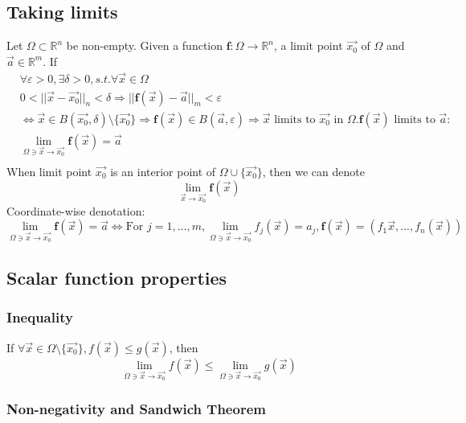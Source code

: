 \documentclass[11pt, a4paper]{article}
\begin{document}
    \subsection{Taking limits}
    Let $\Omega \subset \mathbb{R}^n$ be non-empty. Given a function $\bm{f}: \Omega \to \mathbb{R}^n$, a limit point $\vec{x_0}$ of $\Omega$ and $\vec{a} \in \mathbb{R}^m$. If
    $$\begin{aligned}
        &\forall \varepsilon > 0, \exists \delta > 0, s.t. \forall \vec{x} \in \Omega \\
        &0 < ||\vec{x} - \vec{x_0}||_n < \delta \Rightarrow ||\bm{f}(\vec{x}) - \vec{a}||_m < \varepsilon \\
        &\Leftrightarrow \vec{x} \in B(\vec{x_0}, \delta) \setminus \{\vec{x_0} \} \Rightarrow \bm{f}(\vec{x}) \in B(\vec{a}, \varepsilon)
        \Rightarrow \vec{x} \text{ limits to } \vec{x_0} \text{ in } \Omega. \bm{f}(\vec{x}) \text{ limits to } \vec{a}: \\
        &\lim\limits_{\Omega \ni \vec{x} \to \vec{x_0}} \bm{f}(\vec{x}) = \vec{a} \\
    \end{aligned}$$
    When limit point $\vec{x_0}$ is an interior point of $\Omega \cup \{\vec{x_0} \}$, then we can denote
    $$\lim\limits_{\vec{x} \to \vec{x_0}} \bm{f}(\vec{x})$$
    Coordinate-wise denotation:
    $$\lim\limits_{\Omega \ni \vec{x} \to \vec{x_0}} \bm{f}(\vec{x}) = \vec{a} \Leftrightarrow \text{For }j = 1, ..., m, \lim\limits_{\Omega \ni \vec{x} \to \vec{x_0}} f_j(\vec{x}) = a_j, \bm{f}(\vec{x}) = (f_1{\vec{x}, ..., f_n(\vec{x})})$$
    \subsection{Scalar function properties}
        \subsubsection{Inequality}
        If $\forall \vec{x} \in \Omega \setminus \{\vec{x_0} \}, f(\vec{x}) \leq g(\vec{x})$, then
        $$\lim\limits_{\Omega \ni \vec{x} \to \vec{x_0}} f(\vec{x}) \leq \lim\limits_{\Omega \ni \vec{x} \to \vec{x_0}} g(\vec{x})$$
        \subsubsection{Non-negativity and Sandwich Theorem}
\end{document}
